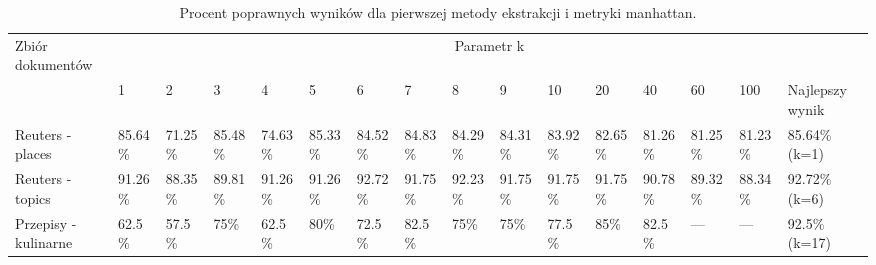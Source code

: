 \documentclass{classrep}
\begin{document}

\begingroup
{\scriptsize  
\setlength{\LTleft}{-20cm plus -1fill}
\setlength{\LTright}{\LTleft}

\begin{longtable}{|p{1cm}|p{0.7cm}|p{0.7cm}|p{0.7cm}|p{0.7cm}|p{0.7cm}|p{0.7cm}|p{0.7cm}|p{0.7cm}|p{0.7cm}|p{0.7cm}|p{0.7cm}|p{0.7cm}|p{0.7cm}|p{0.7cm}|p{1.1cm}|}
\caption{ Procent poprawnych wyników dla pierwszej metody ekstrakcji i metryki manhattan.}\\ 
\hline

Zbiór
dokumentów

 &\multicolumn{15}{c|}{Parametr k}\\
\cline{2-16}
& 1
& 2
& 3
& 4
& 5
& 6
& 7
& 8
& 9
& 10
& 20
& 40
& 60
& 100
& Najlepszy wynik
\\ \hline\hline
Reuters
- places
& 85.64\%	%
& 71.25\%	%
& 85.48\%	%
& 74.63\%	%
& 85.33\%	%
& 84.52\%	%
& 84.83\%	%
& 84.29\%	%
& 84.31\%	%
& 83.92\%	%
& 82.65\%	%
& 81.26\%	%
& 81.25\%	%
& 81.23\%	%
& 85.64\% (k=1)
\\ \hline
Reuters
- topics
& 91.26\%	%
& 88.35\%	%
& 89.81\%	%
& 91.26\%	%
& 91.26\%	%
& 92.72\%	%
& 91.75\%	%
& 92.23\%	%
& 91.75\%	%
& 91.75\%	%
& 91.75\%	%
& 90.78\%	%
& 89.32\%	%
& 88.34\%	%
& 92.72\%  (k=6)
\\ \hline
Przepisy
- kulinarne 
& 62.5\%	%
& 57.5\%	%
& 75\%		%
& 62.5\%	%
& 80\%		%
& 72.5\%	%
& 82.5\%	%
& 75\%		%
& 75\%		%
& 77.5\%	%
& 85\%		%
& 82.5\%	%
& ---		%
& ---		%
& 92.5\% (k=17)
\\ \hline
\end{longtable}
}
\endgroup



\end{document}
